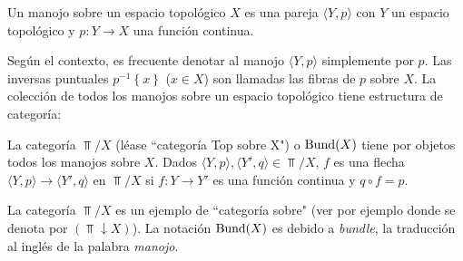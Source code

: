 \begin{Def}[Manojo]
    Un manojo sobre un espacio topológico $X$ es una pareja $\langle Y, p\rangle$ con $Y$ un espacio topológico y $p:Y\to X$ una función continua.
\end{Def}
Según el contexto, es frecuente denotar al manojo $\langle Y,p\rangle$ simplemente por $p$. Las inversas puntuales $p^{-1}\left\lbrace x\right\rbrace$ ($x\in X$) son llamadas las fibras de $p$ sobre $X$. La colección de todos los manojos sobre un espacio topológico tiene estructura de categoría:
\begin{Def}
   La categoría $\Top /X$ (léase ``categoría Top sobre X") o $\normalfont{\text{Bund}} (X)$ tiene por objetos todos los manojos sobre $X$. Dados $\langle Y,p\rangle,\langle Y',q\rangle\in \Top/X$, $f$ es una flecha $\langle Y,p\rangle\to\langle Y',q\rangle$ en $\Top/X$ si $f:Y\to Y'$ es una función continua y $q\circ f=p$.
   
\end{Def}
La categoría $\Top /X$ es un ejemplo de ``categoría sobre" (ver por ejemplo \cite[p.~45]{CWM} donde se denota por $(\Top\downarrow X)$). La notación $\normalfont{\text{Bund}} (X)$ es debido a \textit{bundle}, la traducción al inglés de la palabra \textit{manojo}. 
